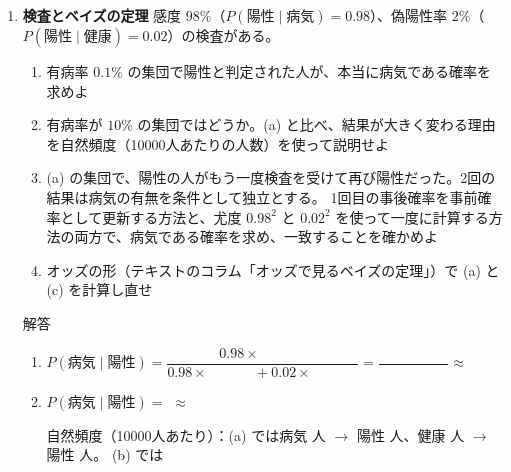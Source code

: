 \documentclass[a4paper,dvipdfmx]{jsarticle}
\newcommand{\提出期限}{2026年11月9日（月）}
\newcommand{\学籍番号}{0000000}
\newcommand{\氏名}{氏名を書く}
\newcommand{\提出日}{2026年11月9日}
\newenvironment{answer}{\begin{itembox}[l]{解答}}{\end{itembox}}
\begin{document}
\begin{enumerate}
  \item \textbf{検査とベイズの定理}\quad
    感度 $98\%$（$P(\text{陽性} \mid \text{病気}) = 0.98$）、偽陽性率 $2\%$（$P(\text{陽性} \mid \text{健康}) = 0.02$）の検査がある。
    \begin{enumerate}
      \item 有病率 $0.1\%$ の集団で陽性と判定された人が、本当に病気である確率を求めよ
      \item 有病率が $10\%$ の集団ではどうか。(a) と比べ、結果が大きく変わる理由を自然頻度（10000人あたりの人数）を使って説明せよ
      \item (a) の集団で、陽性の人がもう一度検査を受けて再び陽性だった。2回の結果は病気の有無を条件として独立とする。
        1回目の事後確率を事前確率として更新する方法と、尤度 $0.98^2$ と $0.02^2$ を使って一度に計算する方法の両方で、病気である確率を求め、一致することを確かめよ
      \item オッズの形（テキストのコラム「オッズで見るベイズの定理」）で (a) と (c) を計算し直せ
    \end{enumerate}
    \begin{answer}
      \begin{enumerate}
        \item
          \begin{equation*}
            P(\text{病気} \mid \text{陽性}) = \frac{0.98 \times \phantom{XXXX}}{0.98 \times \phantom{XXXX} + 0.02 \times \phantom{XXXX}}
            = \frac{\phantom{XXXXXX}}{\phantom{XXXXXX}} \approx \phantom{XXXX}
          \end{equation*}
        \item $P(\text{病気} \mid \text{陽性}) = $ \phantom{XXXXXXXXXXXXXXXX} $\approx$ \phantom{XXXX}
          \vspace{2mm}

          自然頻度（10000人あたり）：(a) では病気 \phantom{XX} 人 $\to$ 陽性 \phantom{XX} 人、健康 \phantom{XXXX} 人 $\to$ 陽性 \phantom{XXX} 人。
          (b) では \phantom{XXXXXXXXXXXXXXXXXXXXXXXX}
          \vspace{2mm}


\end{enumerate}
\end{answer}
\end{enumerate}
\end{document}
